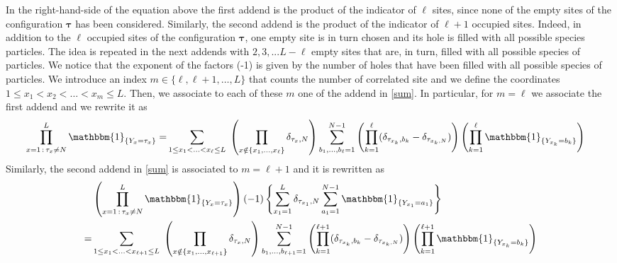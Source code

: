 \documentclass[10pt]{article}
\numberwithin{equation}{section}
\numberwithin{equation}{subsection}
\begin{document}
{\color{blue}In the right-hand-side of the equation above the first addend is the product of the indicator of $\ell$ sites, since none of the empty sites of the configuration $\bm{\tau}$ has been considered. Similarly, the second addend is the product of the indicator of $\ell+1$ occupied sites. Indeed, in addition to the $\ell$ occupied sites of the configuration $\bm{\tau}$, one empty site is in turn chosen and its hole is filled with all possible species particles. The idea is repeated in the next addends with $2,3,...L-\ell$ empty sites that are, in turn, filled with all possible species of particles. We notice that the exponent of the factors (-1) is given by the number of holes that have been filled with all possible species of particles. We introduce an index $m\in \{\ell,\ell+1,\ldots,L\}$ that counts the number of correlated site and we define the coordinates $1\leq x_{1}<x_{2}<\ldots<x_{m}\leq L$. Then, we associate to each of these $m$ one of the addend in \eqref{sum}. In particular, for $m=\ell$ we associate the first addend and we rewrite it as
	\begin{align}
		\prod_{x=1\,:\,\tau_{x}\neq N}^{L}\mathbbm{1}_{\{Y_{x}=\tau_{x}\}}=&%
		\sum_{1\leq x_{1}<\ldots<x_{\ell}\leq L}\;\left(\prod_{x\notin \{x_{1},\ldots,x_{\ell}\}}\delta_{\tau_{x},N}\right)\sum_{b_{1},\ldots,b_{\ell}=1}^{N-1}\left(\prod_{k=1}^{\ell}(\delta_{\tau_{x_{k}},b_{k}}-\delta_{\tau_{x_{k},N}})\right)\left(\prod_{k=1}^{\ell}\mathbbm{1}_{\{Y_{x_{k}}=b_{k}\}}\right)
	\end{align}
	Similarly, the second addend in \eqref{sum} is associated to $m=\ell +1$ and it is rewritten as 
	\begin{align}
&\left(\prod_{x=1\,:\,\tau_{x}\neq N}^{L}\mathbbm{1}_{\{Y_x=\tau_{x}\}}\right)(-1)\left\{\sum_{x_{1}=1}^{L}\delta_{\tau_{x_{1}},N}\sum_{a_{1}=1}^{N-1}\mathbbm{1}_{\{Y_{x_{1}}
	=
	a_{1}\}}\right\}
			\\=&
		\sum_{1\leq x_{1}<\ldots<x_{\ell+1}\leq L}\;\left(\prod_{x\notin \{x_{1},\ldots,x_{\ell+1}\}}\delta_{\tau_{x},N}\right)\sum_{b_{1},\ldots,b_{\ell+1}=1}^{N-1}\left(\prod_{k=1}^{\ell+1}(\delta_{\tau_{x_{k}},b_{k}}-\delta_{\tau_{x_{k},N}})\right)\left(\prod_{k=1}^{\ell+1}\mathbbm{1}_{\{Y_{x_{k}}=b_{k}\}}\right)
	\end{align}
}
\end{document}
